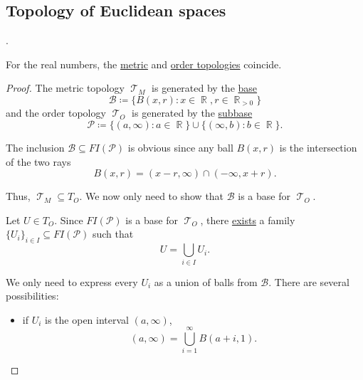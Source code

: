 \subsection{Topology of Euclidean spaces}\label{subsec:topology_of_euclidean_spaces}

\begin{definition}\label{def:euclidean_space}
  .
\end{definition}

\begin{theorem}\label{thm:real_metric_and_order_topologies_coincide}
  For the real numbers, the \hyperref[def:metric_topology]{metric} and \hyperref[def:order_topology]{order topologies} coincide.
\end{theorem}
\begin{proof}
  The metric topology \( \mscrT_M \) is generated by the \hyperref[def:topological_base]{base}
  \begin{equation*}
    \mathcal{B} \coloneqq \{ B(x, r) \colon x \in \BbbR, r \in \BbbR_{>0} \}
  \end{equation*}
  and the order topology \( \mscrT_O \) is generated by the \hyperref[def:topological_subbase]{subbase}
  \begin{equation*}
    \mathcal{P} \coloneqq \{ (a, \infty) \colon a \in \BbbR \} \cup \{ (\infty, b) \colon b \in \BbbR \}.
  \end{equation*}

  The inclusion \( \mathcal{B} \subseteq FI(\mathcal{P}) \) is obvious since any ball \( B(x, r) \) is the intersection of the two rays
  \begin{equation*}
    B(x, r) = (x - r, \infty) \cap (-\infty, x + r).
  \end{equation*}

  Thus, \( \mscrT_M \subseteq T_O \). We now only need to show that \( \mathcal{B} \) is a base for \( \mscrT_O \).

  Let \( U \in T_O \). Since \( FI(\mathcal{P}) \) is a base for \( \mscrT_O \), there \hyperref[def:topological_base/union]{exists} a family \( \{ U_i \}_{i \in I} \subseteq FI(\mathcal{P}) \) such that
  \begin{equation*}
    U = \bigcup_{i \in I} U_i.
  \end{equation*}

  We only need to express every \( U_i \) as a union of balls from \( \mathcal{B} \). There are several possibilities:
  \begin{itemize}
    \item if \( U_i \) is the open interval \( (a, \infty) \),
          \begin{equation*}
            (a, \infty) = \bigcup_{i=1}^\infty B(a + i, 1).
          \end{equation*}


\end{itemize}
\end{proof}

